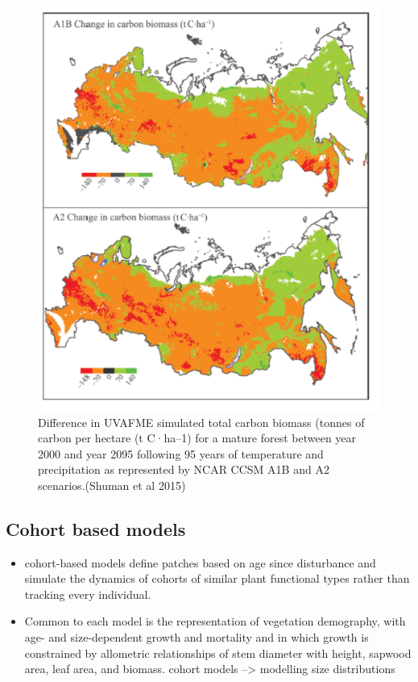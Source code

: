 \documentclass[
  12pt,
  oneside]{book}
\providecommand{\tightlist}{%
  \setlength{\itemsep}{0pt}\setlength{\parskip}{0pt}}
\begin{document}
\begin{figure}

{\centering \includegraphics[width=0.8\linewidth]{figures/chap6/f614_uvafme_russia} 

}

\caption{Difference in UVAFME simulated total carbon biomass (tonnes of carbon per hectare (t C·ha–1) for a mature forest between year 2000 and year 2095 following 95 years of temperature and precipitation as represented by NCAR CCSM A1B and A2 scenarios.(Shuman et al 2015)}\label{fig:f614}
\end{figure}

\hypertarget{cohort-based-models}{%
\subsection{Cohort based models}\label{cohort-based-models}}

\begin{itemize}
\tightlist
\item
  cohort-based models define patches based on age since disturbance and simulate the dynamics of cohorts of similar plant functional types rather than tracking every individual.
\item
  Common to each model is the representation of vegetation demography, with age- and size-dependent growth and mortality and in which growth is constrained by allometric relationships of stem diameter with height, sapwood area, leaf area, and biomass. cohort models --\textgreater{} modelling size distributions
\end{itemize}
\end{document}
